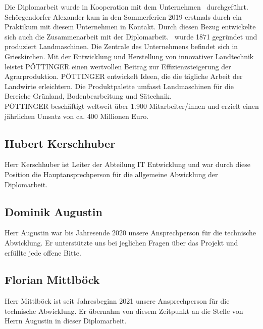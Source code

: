 Die Diplomarbeit wurde in Kooperation mit dem Unternehmen \ThPartnerName \, durchgeführt. Schörgendorfer Alexander kam in den Sommerferien 2019 erstmals durch ein Praktikum mit diesem Unternehmen in Kontakt. Durch diesen Bezug entwickelte sich auch die Zusammenarbeit mit der Diplomarbeit. \ThPartnerName \, wurde 1871 gegründet und produziert Landmaschinen. Die Zentrale des Unternehmens befindet sich in Grieskirchen. \newpage
Mit der Entwicklung und Herstellung von innovativer Landtechnik leistet PÖTTINGER einen wertvollen Beitrag zur Effizienzsteigerung der Agrarproduktion. PÖTTINGER entwickelt Ideen, die die tägliche Arbeit der Landwirte erleichtern. Die Produktpalette umfasst Landmaschinen für die Bereiche Grünland, Bodenbearbeitung und Sätechnik.\\
PÖTTINGER beschäftigt weltweit über 1.900 Mitarbeiter/innen und erzielt einen  jährlichen Umsatz von ca. 400 Millionen Euro.

\subsection{Hubert Kerschhuber}

Herr Kerschhuber ist Leiter der Abteilung IT Entwicklung und war durch diese Position die Hauptansprechperson für die allgemeine Abwicklung der Diplomarbeit.

\subsection{Dominik Augustin}

Herr Augustin war bis Jahresende 2020 unsere Ansprechperson für die technische Abwicklung. Er unterstützte uns bei jeglichen Fragen über das Projekt und erfüllte jede offene Bitte.

\subsection{Florian Mittlböck}

Herr Mittlböck ist seit Jahresbeginn 2021 unsere Ansprechperson für die technische Abwicklung. Er übernahm von diesem Zeitpunkt an die Stelle von Herrn Augustin in dieser Diplomarbeit.
